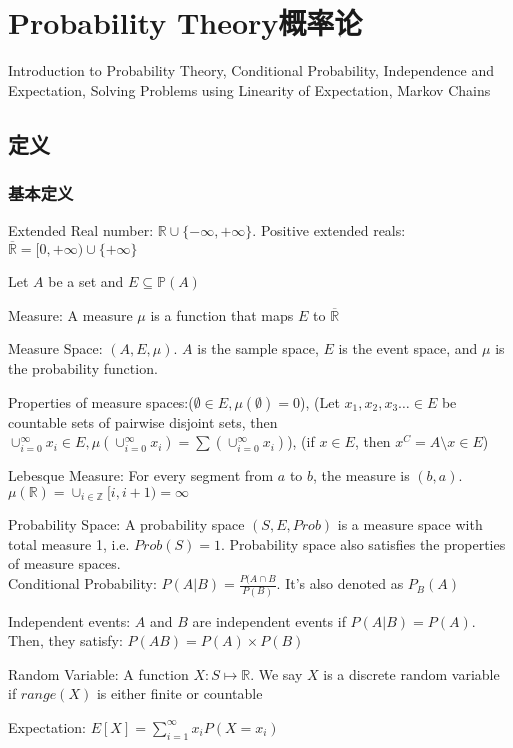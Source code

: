 \documentclass[12pt,a4paper]{ctexrep}
\begin{document}
\fi

\chapter{Probability Theory概率论}
Introduction to Probability Theory, Conditional Probability, Independence and Expectation, Solving Problems using Linearity of Expectation, Markov Chains
\section{定义}
\subsection{基本定义}
Extended Real number: $\mathbb{R}\cup \{-\infty,+\infty\}$. Positive extended reals:$\overline{\mathbb{R}} = [0,+\infty) \cup \{+\infty\}$

Let $A$ be a set and $E \subseteq \mathbb{P}(A)$

Measure: A measure $\mu$ is a function that maps $E$ to $\overline{\mathbb{R}}$

Measure Space: $(A,E,\mu)$. $A$ is the sample space, $E$ is the event space, and $\mu$ is the probability function.

Properties of measure spaces:($\emptyset \in E, \mu(\emptyset) = 0$), (Let $x_1,x_2,x_3\dots \in E$ be countable sets of pairwise disjoint sets, then $\cup_{i=0}^{\infty} x_i\in E, \mu(\cup_{i=0}^{\infty} x_i) = \sum(\cup_{i=0}^{\infty} x_i)$), (if $x \in E$, then $x^C = A \setminus x \in E$)

Lebesque Measure: For every segment from $a$ to $b$, the measure is $(b,a)$. $\mu(\mathbb{R}) = \cup_{i\in \mathbb{Z}} [i,i+1) = \infty$

Probability Space: A probability space $(S,E,Prob)$ is a measure space with total measure 1, i.e. $Prob(S) = 1$. Probability space also satisfies the properties of measure spaces.\\

Conditional Probability: $P(A|B) = \frac{P(A\cap B}{P(B)}$. It's also denoted as $P_B(A)$

Independent events: $A$ and $B$ are independent events if $P(A|B) = P(A)$. Then, they satisfy: $P(AB) = P(A)\times P(B)$

Random Variable: A function $X: S \mapsto \mathbb{R}$. We say $X$ is a discrete random variable if $range(X)$ is either finite or countable

Expectation: $E[X] = \sum_{i = 1}^{\infty} x_i P(X = x_i)$
\end{document}
